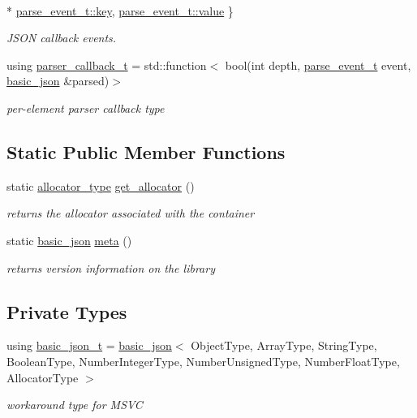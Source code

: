 \begin{DoxyCompactItemize}
\\*
\hyperlink{classnlohmann_1_1basic__json_aea1c863b719b4ca5b77188c171bbfafea3c6e0b8a9c15224a8228b9a98ca1531d}{parse\+\_\+event\+\_\+t\+::key}, 
\hyperlink{classnlohmann_1_1basic__json_aea1c863b719b4ca5b77188c171bbfafea2063c1608d6e0baf80249c42e2be5804}{parse\+\_\+event\+\_\+t\+::value}
 \}\begin{DoxyCompactList}\small\item\em J\+S\+O\+N callback events. \end{DoxyCompactList}
\item 
using \hyperlink{classnlohmann_1_1basic__json_a9e35475e2027520a78e09f460dbe048a}{parser\+\_\+callback\+\_\+t} = std\+::function$<$ bool(int depth, \hyperlink{classnlohmann_1_1basic__json_aea1c863b719b4ca5b77188c171bbfafe}{parse\+\_\+event\+\_\+t} event, \hyperlink{classnlohmann_1_1basic__json}{basic\+\_\+json} \&parsed)$>$
\begin{DoxyCompactList}\small\item\em per-\/element parser callback type \end{DoxyCompactList}\end{DoxyCompactItemize}
\subsection*{Static Public Member Functions}
\begin{DoxyCompactItemize}
\item 
static \hyperlink{classnlohmann_1_1basic__json_aa44ce84b9ac506b905b8fb56c9a0989d}{allocator\+\_\+type} \hyperlink{classnlohmann_1_1basic__json_a1a446a48beed4ea564addfd12d235793}{get\+\_\+allocator} ()
\begin{DoxyCompactList}\small\item\em returns the allocator associated with the container \end{DoxyCompactList}\item 
static \hyperlink{classnlohmann_1_1basic__json}{basic\+\_\+json} \hyperlink{classnlohmann_1_1basic__json_a86ef079231507be389e2add3935e5ebb}{meta} ()
\begin{DoxyCompactList}\small\item\em returns version information on the library \end{DoxyCompactList}\end{DoxyCompactItemize}
\subsection*{Private Types}
\begin{DoxyCompactItemize}
\item 
using \hyperlink{classnlohmann_1_1basic__json_a3e59ba94923629542aa2a914f0bc2eec}{basic\+\_\+json\+\_\+t} = \hyperlink{classnlohmann_1_1basic__json}{basic\+\_\+json}$<$ Object\+Type, Array\+Type, String\+Type, Boolean\+Type, Number\+Integer\+Type, Number\+Unsigned\+Type, Number\+Float\+Type, Allocator\+Type $>$
\begin{DoxyCompactList}\small\item\em workaround type for M\+S\+V\+C \end{DoxyCompactList}\end{DoxyCompactItemize}
